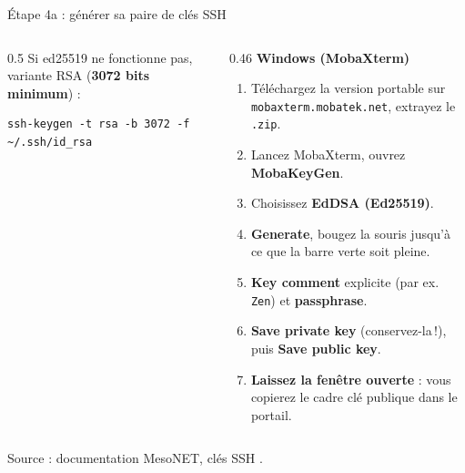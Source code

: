 \documentclass[8pt,aspectratio=169]{beamer}
\newcommand{\src}[1]{\vfill{\tiny\color{gray}Source : #1\par}}
\begin{document}
\begin{frame}[fragile]{Étape 4a : générer sa paire de clés SSH}
\begin{columns}[T]
\begin{column}{0.5\textwidth}
Si ed25519 ne fonctionne pas, variante RSA (\textbf{3072 bits minimum}) :
\begin{verbatim}
ssh-keygen -t rsa -b 3072 -f ~/.ssh/id_rsa
\end{verbatim}
\end{column}
\begin{column}{0.46\textwidth}
\textbf{Windows (MobaXterm)}
\begin{enumerate}
\item Téléchargez la version portable sur \texttt{mobaxterm.mobatek.net}, extrayez le \texttt{.zip}.
\item Lancez MobaXterm, ouvrez \textbf{MobaKeyGen}.
\item Choisissez \textbf{EdDSA (Ed25519)}.
\item \textbf{Generate}, bougez la souris jusqu'à ce que la barre verte soit pleine.
\item \textbf{Key comment} explicite (par ex. \texttt{Zen}) et \textbf{passphrase}.
\item \textbf{Save private key} (conservez-la\,!), puis \textbf{Save public key}.
\item \textbf{Laissez la fenêtre ouverte} : vous copierez le cadre \og clé publique \fg{} dans le portail.
\end{enumerate}
\end{column}
\end{columns}
\src{documentation MesoNET, \og clés SSH \fg.}
\end{frame}
\end{document}
